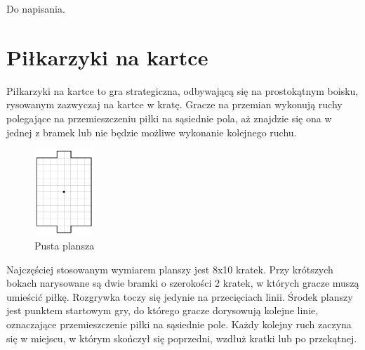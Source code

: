 \documentclass[licencjacka]{pracamgr}
\begin{document}



Do napisania.

\section{Piłkarzyki na kartce}

Piłkarzyki na kartce to gra strategiczna, odbywającą się na prostokątnym boisku, rysowanym zazwyczaj na kartce w kratę.
Gracze na przemian wykonują ruchy polegające na przemieszczeniu piłki na sąsiednie pola, aż znajdzie się ona w jednej z bramek lub nie będzie możliwe wykonanie kolejnego ruchu.

\begin{figure}[ht]
  \centering
  \includegraphics[width=0.2\textwidth]{board}
  \caption{Pusta plansza}
\end{figure}

Najczęściej stosowanym wymiarem planszy jest 8x10 kratek.
Przy krótszych bokach narysowane są dwie bramki o szerokości 2 kratek, w których gracze muszą umieścić piłkę.
Rozgrywka toczy się jedynie na przecięciach linii.
Środek planszy jest punktem startowym gry, do którego gracze dorysowują kolejne linie, oznaczające przemieszczenie piłki na sąsiednie pole. Każdy kolejny ruch zaczyna się w miejscu, w którym skończył się poprzedni, wzdłuż kratki lub po przekątnej. 
\end{document}

